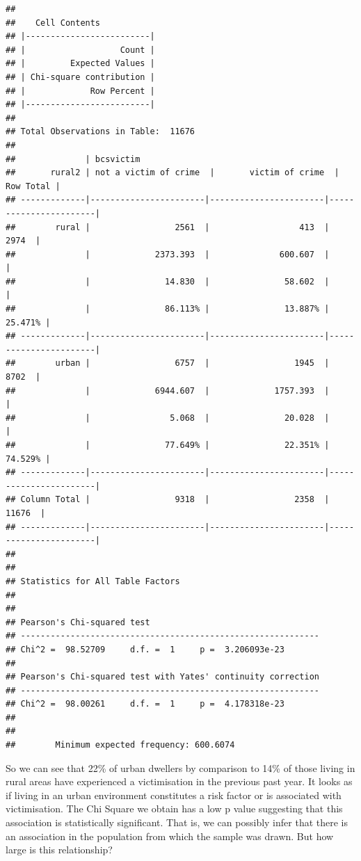 \documentclass[]{book}
\theoremstyle{definition}
\theoremstyle{definition}
\theoremstyle{definition}
\theoremstyle{remark}
\begin{document}
\begin{verbatim}
## 
##    Cell Contents
## |-------------------------|
## |                   Count |
## |         Expected Values |
## | Chi-square contribution |
## |             Row Percent |
## |-------------------------|
## 
## Total Observations in Table:  11676 
## 
##              | bcsvictim 
##       rural2 | not a victim of crime  |       victim of crime  |             Row Total | 
## -------------|-----------------------|-----------------------|-----------------------|
##        rural |                 2561  |                  413  |                 2974  | 
##              |             2373.393  |              600.607  |                       | 
##              |               14.830  |               58.602  |                       | 
##              |               86.113% |               13.887% |               25.471% | 
## -------------|-----------------------|-----------------------|-----------------------|
##        urban |                 6757  |                 1945  |                 8702  | 
##              |             6944.607  |             1757.393  |                       | 
##              |                5.068  |               20.028  |                       | 
##              |               77.649% |               22.351% |               74.529% | 
## -------------|-----------------------|-----------------------|-----------------------|
## Column Total |                 9318  |                 2358  |                11676  | 
## -------------|-----------------------|-----------------------|-----------------------|
## 
##  
## Statistics for All Table Factors
## 
## 
## Pearson's Chi-squared test 
## ------------------------------------------------------------
## Chi^2 =  98.52709     d.f. =  1     p =  3.206093e-23 
## 
## Pearson's Chi-squared test with Yates' continuity correction 
## ------------------------------------------------------------
## Chi^2 =  98.00261     d.f. =  1     p =  4.178318e-23 
## 
##  
##        Minimum expected frequency: 600.6074
\end{verbatim}

So we can see that 22\% of urban dwellers by comparison to 14\% of those
living in rural areas have experienced a victimisation in the previous
past year. It looks as if living in an urban environment constitutes a
risk factor or is associated with victimisation. The Chi Square we
obtain has a low p value suggesting that this association is
statistically significant. That is, we can possibly infer that there is
an association in the population from which the sample was drawn. But
how large is this relationship?
\end{document}
